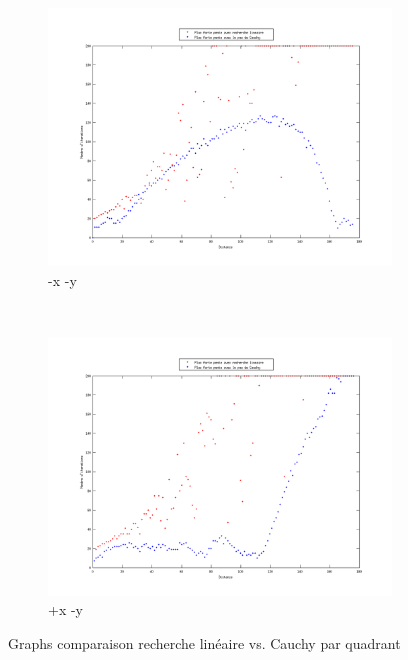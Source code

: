 \documentclass[11pt,a4paper,twoside,onecolumn,titlepage]{report}
\begin{document}
\begin{enumerate}[(a)]
\begin{figure}[h!]
	\begin{subfigure}[t]{0.5\textwidth}
		\centering
		\includegraphics[scale=0.4]{steps-quarter-1}
		\caption{-x -y}
		\label{fig:fig:rlVSqnQ1}
	\end{subfigure}%
        ~ %
    \begin{subfigure}[t]{0.5\textwidth}
		\centering
		\includegraphics[scale=0.4]{steps-quarter-2}
		\caption{+x -y}
		\label{fig:fig:rlVSqnQ2}
	\end{subfigure}
    \caption{Graphs comparaison recherche linéaire vs. Cauchy par quadrant}\label{fig:steps-4}
\end{figure}



\end{enumerate}
\end{document}

